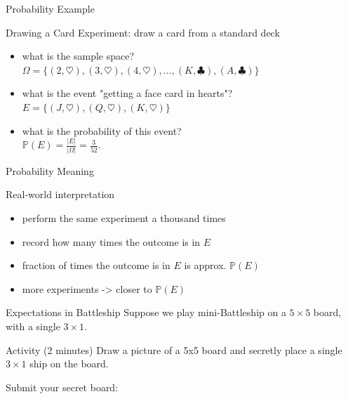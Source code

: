 \documentclass{beamer}
\begin{document}
\begin{frame}{Probability Example}
  \begin{block}{Drawing a Card}
    Experiment: draw a card from a standard deck
    \begin{itemize}
\pause
      \item what is the sample space?\\
\pause
        $\Omega = \{(2,\heartsuit),(3,\heartsuit),(4,\heartsuit),\dots,(K,\clubsuit),(A,\clubsuit)\}$
\pause
      \item what is the event "getting a face card in hearts"?\\
\pause
        $E = \{(J,\heartsuit),(Q,\heartsuit),(K,\heartsuit)\}$
\pause
      \item what is the probability of this event?\\
\pause
        $\mathbb{P}(E) = \frac{|E|}{|\Omega|} = \frac{3}{52}.$
    \end{itemize}
  \end{block}
\end{frame}

\begin{frame}{Probability Meaning}
  \begin{block}{Real-world interpretation}
    \begin{itemize}
\pause
      \item perform the same experiment a thousand times
\pause
      \item record how many times the outcome is in $E$
\pause
      \item fraction of times the outcome is in $E$ is approx. $\mathbb P(E)$
\pause
      \item more experiments -> closer to $\mathbb P(E)$
    \end{itemize}
  \end{block}
\end{frame}

\begin{frame}{Expectations in Battleship}
Suppose we play mini-Battleship on a $5\times 5$ board, with a single $3\times 1$.
\pause
\begin{block}{Activity (2 minutes)}
Draw a picture of a 5x5 board and secretly place a single $3\times 1$ ship on the board.\\
\end{block}
  \begin{block}{Submit your secret board:}
    \begin{center}
    \end{center}
  \end{block}
\end{frame}
\end{document}
